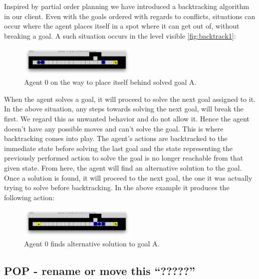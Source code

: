 \documentclass[Main]{subfiles}
\begin{document}
Inspired by partial order planning we have introduced a backtracking algorithm in our client. Even with the goals ordered with regards to conflicts, situations can occur where the agent places itself in a spot where it can get out of, without breaking a goal. A such situation occurs in the level visible \autoref{fig:backtrack1}:
\begin{figure}[h!]
    \centering
    \includegraphics[width=0.5\textwidth]{backtrack1.png}
    \caption{Agent 0 on the way to place itself behind solved goal A.}
    \label{fig:backtrack1}
\end{figure}

When the agent solves a goal, it will proceed to solve the next goal assigned to it. In the above situation, any steps towards solving the next goal, will break the first. We regard this as unwanted behavior and do not allow it. Hence the agent doesn't have any possible moves and can't solve the goal. This is where backtracking comes into play. The agent's actions are backtracked to the immediate state before solving the last goal and the state representing the previously performed action to solve the goal is no longer reachable from that given state. From here, the agent will find an alternative solution to the goal. Once a solution is found, it will proceed to the next goal, the one it was actually trying to solve before backtracking. In the above example it produces the following action:
\begin{figure}[h!]
    \centering
    \includegraphics[width=0.5\textwidth]{backtrack2.png}
    \caption{Agent 0 finds alternative solution to goal A.}
    \label{fig:backtrack2}
\end{figure}





\subsection{POP - rename or move this ``?????'' }
\end{document}
